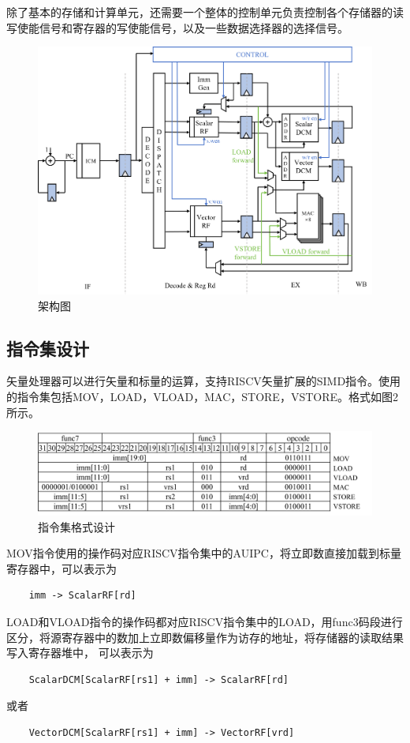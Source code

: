 \documentclass[UTF8]{ctexart}
\begin{document}
除了基本的存储和计算单元，还需要一个整体的控制单元负责控制各个存储器的读写使能信号和寄存器的写使能信号，以及一些数据选择器的选择信号。

\begin{figure}[htbp]
    \centering
    \includegraphics[width=16cm]{pic/Structure.png}
    \caption{架构图}
\end{figure}

\subsection{指令集设计}
矢量处理器可以进行矢量和标量的运算，支持RISCV矢量扩展的SIMD指令。使用的指令集包括MOV，LOAD，VLOAD，MAC，STORE，VSTORE。格式如图2所示。
\begin{figure}[htbp]
    \centering
    \includegraphics[width=18cm]{pic/instr_set.png}
    \caption{指令集格式设计}
\end{figure}

MOV指令使用的操作码对应RISCV指令集中的AUIPC，将立即数直接加载到标量寄存器中，可以表示为
\begin{lstlisting}
    imm -> ScalarRF[rd]
\end{lstlisting}

LOAD和VLOAD指令的操作码都对应RISCV指令集中的LOAD，用func3码段进行区分，将源寄存器中的数加上立即数偏移量作为访存的地址，将存储器的读取结果写入寄存器堆中，
可以表示为
\begin{lstlisting}
    ScalarDCM[ScalarRF[rs1] + imm] -> ScalarRF[rd]
\end{lstlisting}
或者
\begin{lstlisting}
    VectorDCM[ScalarRF[rs1] + imm] -> VectorRF[vrd]
\end{lstlisting}
\end{document}
